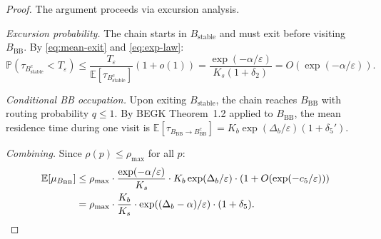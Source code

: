 \documentclass[11pt]{article}
\newcommand{\eps}{\varepsilon}
\newcommand{\Db}{\Delta_b}
\newcommand{\Bstable}{B_{\mathrm{stable}}}
\newcommand{\BBB}{B_{\mathrm{BB}}}
\newcommand{\Teps}{T_\eps}
\newcommand{\muBB}{\mu_{\BBB}}
\begin{document}
\begin{proof}
The argument proceeds via excursion analysis.

\emph{Excursion probability.}
The chain starts in $\Bstable$ and must exit before visiting $\BBB$.
By \eqref{eq:mean-exit} and \eqref{eq:exp-law}:
\begin{equation}\label{eq:exc-prob}
  \mathbb{P}(\tau_{\Bstable^c} < \Teps)
  \leq \frac{\Teps}{\mathbb{E}[\tau_{\Bstable^c}]}(1 + o(1))
  = \frac{\exp(-\alpha/\eps)}{K_s(1+\delta_2)}
  = O(\exp(-\alpha/\eps)).
\end{equation}

\emph{Conditional BB occupation.}
Upon exiting $\Bstable$, the chain reaches $\BBB$ with routing
probability $q \leq 1$.  By BEGK Theorem~1.2 applied to $\BBB$,
the mean residence time during one visit is
$\mathbb{E}[\tau_{\BBB \to \BBB^c}]
= K_b \exp(\Db/\eps)(1 + \delta_5')$.

\emph{Combining.}
Since $\rho(p) \leq \rho_{\max}$ for all $p$:
\begin{align*}
  \mathbb{E}[\muBB]
  &\leq \rho_{\max} \cdot
    \frac{\exp(-\alpha/\eps)}{K_s}
    \cdot K_b \exp(\Db/\eps)
    \cdot (1 + O(\exp(-c_5/\eps))) \\
  &= \rho_{\max} \cdot \frac{K_b}{K_s}
    \cdot \exp((\Db - \alpha)/\eps)
    \cdot (1 + \delta_5). \qedhere
\end{align*}
\end{proof}
\end{document}
